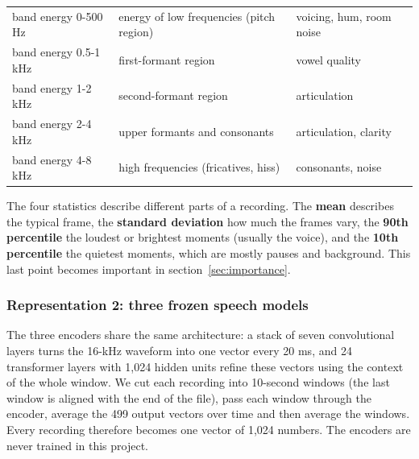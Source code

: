 \documentclass[11pt,a4paper]{article}
\begin{document}
\begin{center}
\begin{longtable}{>{\raggedright\arraybackslash}p{3.32cm}>{\raggedright\arraybackslash}p{5.86cm}>{\raggedright\arraybackslash}p{6.06cm}}
\hspace{0pt}band energy 0-500 Hz & \hspace{0pt}energy of low frequencies (pitch region) & \hspace{0pt}voicing, hum, room noise\\
\hspace{0pt}band energy 0.5-1 kHz & \hspace{0pt}first-formant region & \hspace{0pt}vowel quality\\
\hspace{0pt}band energy 1-2 kHz & \hspace{0pt}second-formant region & \hspace{0pt}articulation\\
\hspace{0pt}band energy 2-4 kHz & \hspace{0pt}upper formants and consonants & \hspace{0pt}articulation, clarity\\
\hspace{0pt}band energy 4-8 kHz & \hspace{0pt}high frequencies (fricatives, hiss) & \hspace{0pt}consonants, noise\\
\end{longtable}\end{center}
\begin{tcolorbox}[colback=green!3,colframe=green!40!black,boxrule=0.5pt,arc=2pt,left=5pt,right=5pt,top=3pt,bottom=3pt,title={\small\bfseries In plain words}]\small The four statistics describe different parts of a recording. The \textbf{mean} describes the typical frame, the \textbf{standard deviation} how much the frames vary, the \textbf{90th percentile} the loudest or brightest moments (usually the voice), and the \textbf{10th percentile} the quietest moments, which are mostly pauses and background. This last point becomes important in section~\ref{sec:importance}.\end{tcolorbox}
\subsubsection{Representation 2: three frozen speech models}
The three encoders share the same architecture: a stack of seven convolutional layers turns the 16-kHz waveform into one vector every 20 ms, and 24 transformer layers with 1,024 hidden units refine these vectors using the context of the whole window. We cut each recording into 10-second windows (the last window is aligned with the end of the file), pass each window through the encoder, average the 499 output vectors over time and then average the windows. Every recording therefore becomes one vector of 1,024 numbers. The encoders are never trained in this project.
\end{document}
